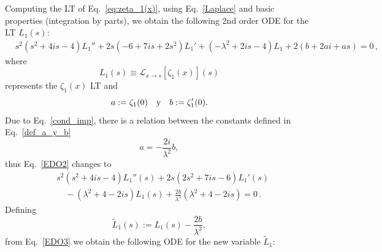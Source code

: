\documentclass[%
 aip,
 jmp,%
 amsmath,amssymb,
 reprint,%
]{revtex4-2}
\begin{document}
Computing the LT of Eq.~\eqref{eq:zeta_1(x)}, using Eq.~\eqref{Laplace} and basic properties (integration by parts), we obtain the following 2nd order ODE for the LT $L_1(s)$:
\begin{equation}\label{EDO2}
\begin{aligned}
& s^2 \left(s^2+4is -4\right)L_1'' + 2s \left(-6+7is+2s^2\right)L_1' + \left(-\lambda^2+2is-4\right)L_1+2\left(b+2ai+as\right)=0\,,
\end{aligned}
\end{equation}
where 
\[
L_1(s)\equiv\mathcal{L}_{x\to s}\left[\zeta_1(x)\right](s)
\]
represents the $\zeta_1(x)$ LT and
\begin{equation}\label{def_a_y_b}
    a:=\zeta_1(0)\quad \textnormal{y}\quad b:=\zeta_1'(0).
\end{equation}
Due to Eq.~\eqref{cond_imp}, there is a relation between the constants defined in Eq.~\eqref{def_a_y_b}
\begin{equation*}
    a= -\frac{2i}{\lambda^2} b,
\end{equation*}
thus Eq.~\eqref{EDO2} changes to
\begin{equation}\label{EDO3}
\begin{aligned}
& s^2 \left(s^2+4is -4\right)L_1''(s) + 2s \left(2s^2+7is-6\right)L_1'(s) \\
& \quad - \left(\lambda^2+4 -2is\right)L_1(s)+ \frac{2b}{\lambda^2} \left( \lambda^2 +4  -2i s\right)=0\,.
\end{aligned}
\end{equation}
Defining
\[
\widetilde L_1(s):=   L_1(s) -  \frac{2b}{\lambda^2},
\]
from Eq.~\eqref{EDO3} we obtain the following ODE for the new variable $\widetilde L_1$:
\end{document}
